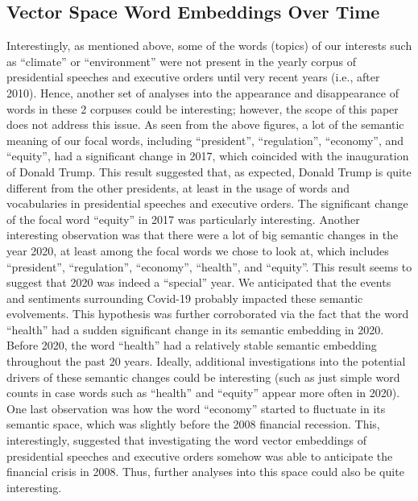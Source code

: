 \documentclass{article}
\begin{document}
{\subsection{Vector Space Word Embeddings Over Time}{Interestingly, as mentioned above, some of the words (topics) of our interests such as “climate” or “environment” were not present in the yearly corpus of presidential speeches and executive orders until very recent years (i.e., after 2010). Hence, another set of analyses into the appearance and disappearance of words in these 2 corpuses could be interesting; however, the scope of this paper does not address this issue.
As seen from the above figures, a lot of the semantic meaning of our focal words, including “president”, “regulation”, “economy”, and “equity”, had a significant change in 2017, which coincided with the inauguration of Donald Trump. This result suggested that, as expected, Donald Trump is quite different from the other presidents, at least in the usage of words and vocabularies in presidential speeches and executive orders. The significant change of the focal word “equity” in 2017 was particularly interesting. 
Another interesting observation was that there were a lot of big semantic changes in the year 2020, at least among the focal words we chose to look at, which includes “president”, “regulation”, “economy”, “health”, and “equity”. This result seems to suggest that 2020 was indeed a “special” year. We anticipated that the events and sentiments surrounding Covid-19 probably impacted these semantic evolvements. This hypothesis was further corroborated via the fact that the word “health” had a sudden significant change in its semantic embedding in 2020. Before 2020, the word “health” had a relatively stable semantic embedding throughout the past 20 years. Ideally, additional investigations into the potential drivers of these semantic changes could be interesting (such as just simple word counts in case words such as “health” and “equity” appear more often in 2020).
One last observation was how the word “economy” started to fluctuate in its semantic space, which was slightly before the 2008 financial recession. This, interestingly, suggested that investigating the word vector embeddings of presidential speeches and executive orders somehow was able to anticipate the financial crisis in 2008. Thus, further analyses into this space could also be quite interesting.}
\begin{figure}[H]
\end{figure}}
\end{document}
